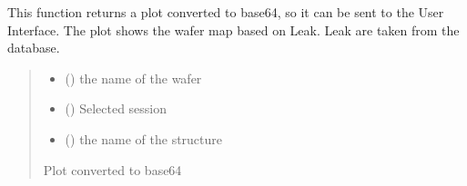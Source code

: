 \documentclass[letterpaper,10pt,english]{sphinxmanual}
\begin{document}
\begin{fulllineitems}
\label{\detokenize{WaferMaps:WaferMaps.Leak_wafer_map}}
\pysigstartsignatures
{}
\pysigstopsignatures
\sphinxAtStartPar
This function returns a plot converted to base64, so it can be sent to the User Interface. The plot shows the wafer map based on Leak.
Leak are taken from the database.
\begin{quote}\begin{description}
\begin{itemize}
\item {} 
\sphinxAtStartPar
{} () \textendash{} the name of the wafer

\item {} 
\sphinxAtStartPar
{} () \textendash{} Selected session

\item {} 
\sphinxAtStartPar
{} () \textendash{} the name of the structure

\end{itemize}

\sphinxAtStartPar
Plot converted to base64

\end{description}\end{quote}

\end{fulllineitems}

\end{document}
